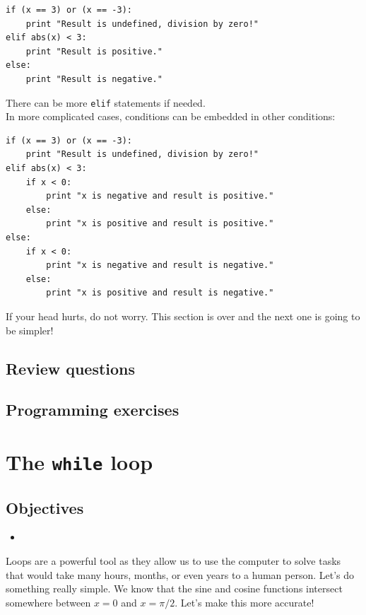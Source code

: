 \begin{verbatim}
if (x == 3) or (x == -3):
    print "Result is undefined, division by zero!"
elif abs(x) < 3:
    print "Result is positive."
else:
    print "Result is negative."
\end{verbatim}
There can be more {\tt elif} statements if needed. \\

\noindent
In more complicated cases, conditions can be embedded in other conditions:

\begin{verbatim}
if (x == 3) or (x == -3):
    print "Result is undefined, division by zero!"
elif abs(x) < 3:
    if x < 0:
        print "x is negative and result is positive."
    else: 
        print "x is positive and result is positive."
else:
    if x < 0:
        print "x is negative and result is negative."
    else: 
        print "x is positive and result is negative."
\end{verbatim}
If your head hurts, do not worry. This section is over 
and the next one is going to be simpler!

\subsection{Review questions}

\subsection{Programming exercises}


\section{The {\tt while} loop}\label{sec:while}

\subsection{Objectives}

\begin{itemize}
\item
\end{itemize}

Loops are a powerful tool as they allow us to use the computer to solve
tasks that would take many hours, months, or even years to a human person. 
Let's do something really simple. We know that the sine and cosine functions 
intersect somewhere between $x = 0$ and $x = \pi/2$. Let's make this more accurate!

